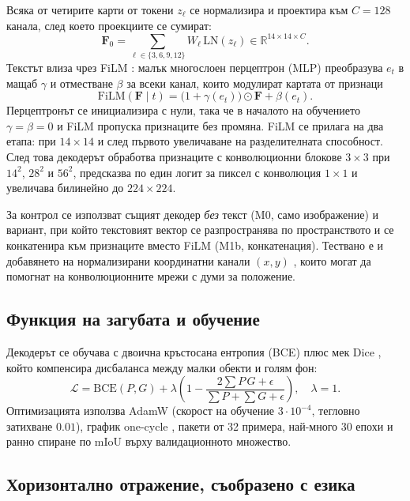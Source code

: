 \documentclass[conference,a4paper]{IEEEtran}
\newcommand{\Ffeat}{\mathbf{F}}
\newcommand{\film}{\mathrm{FiLM}}
\begin{document}
Всяка от четирите карти от токени $z_\ell$ се нормализира и проектира към $C = 128$ канала, след
което проекциите се сумират:
\begin{equation}
\Ffeat_0 = \sum_{\ell \in \{3,6,9,12\}} W_\ell \, \mathrm{LN}(z_\ell) \in \mathbb{R}^{14\times14\times C}.
\end{equation}
Текстът влиза чрез FiLM \cite{perez2018film}: малък многослоен перцептрон (MLP) преобразува $e_t$
в мащаб $\gamma$ и отместване $\beta$ за всеки канал, които модулират картата от признаци
\begin{equation}
\film(\Ffeat \mid t) = \bigl(1 + \gamma(e_t)\bigr) \odot \Ffeat + \beta(e_t).
\label{eq:film}
\end{equation}
Перцептронът се инициализира с нули, така че в началото на обучението $\gamma = \beta = 0$ и FiLM
пропуска признаците без промяна. FiLM се прилага на
два етапа: при $14\times14$ и след първото увеличаване на разделителната способност. След това
декодерът обработва признаците с конволюционни блокове $3\times3$ при $14^2$, $28^2$ и $56^2$,
предсказва по един логит за пиксел с конволюция $1\times1$ и увеличава билинейно до
$224\times224$.

За контрол се използват същият декодер \emph{без} текст (M0, само изображение) и вариант, при който
текстовият вектор се разпространява по пространството и се конкатенира към признаците вместо FiLM
(M1b, конкатенация). Тествано е и добавянето на нормализирани координатни канали $(x,y)$
\cite{liu2018coordconv}, които могат да помогнат на конволюционните мрежи с думи за положение.

\subsection{Функция на загубата и обучение}

Декодерът се обучава с двоична кръстосана ентропия (BCE) плюс мек Dice \cite{milletari2016vnet},
който компенсира дисбаланса между малки обекти и голям фон:
\begin{equation}
\mathcal{L} = \mathrm{BCE}(P, G) + \lambda \left(1 - \frac{2\sum P\,G + \epsilon}{\sum P + \sum G + \epsilon}\right),
\quad \lambda = 1.
\end{equation}
Оптимизацията използва AdamW \cite{loshchilov2019adamw} (скорост на обучение $3\cdot10^{-4}$,
тегловно затихване $0.01$), график one-cycle \cite{smith2019onecycle}, пакети от 32 примера, най-много
30 епохи и ранно спиране по mIoU върху валидационното множество.

\subsection{Хоризонтално отражение, съобразено с езика}
\end{document}
